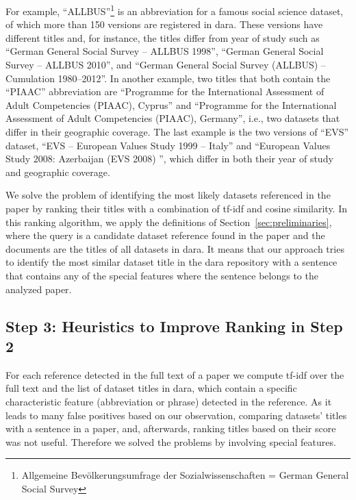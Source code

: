 \documentclass{IOS-Book-Article}
\newcommand{\dara}{\textsf{da\textbar ra}}
\begin{document}
For example, \enquote{ALLBUS}\footnote{Allgemeine Bev\"olkerungsumfrage der Sozialwissenschaften = German General Social Survey} is an abbreviation for a famous social science dataset, of which more than 150 versions are registered in {\dara}. These versions have different titles and, for instance, the titles differ from year of study such as \enquote{German General
Social Survey -- ALLBUS 1998}, 
\enquote{German General Social Survey -- ALLBUS 2010}, and \enquote{German General Social Survey (ALLBUS) -- Cumulation 1980--2012}.
In another example, two titles that both contain the \enquote{PIAAC} abbreviation are \enquote{Programme for the International Assessment of Adult Competencies (PIAAC), Cyprus} and \enquote{Programme for the International Assessment of Adult Competencies (PIAAC), Germany}, i.e., two datasets that differ in their geographic coverage. The last example is the two versions of \enquote{EVS} dataset, 
\enquote{EVS -- European Values Study 1999 -- Italy} and \enquote{European Values Study 2008: Azerbaijan (EVS 2008) }, which differ in both their year of study and geographic coverage.

We solve the problem of identifying the most likely datasets referenced in the paper by ranking their titles with a combination of tf-idf and cosine similarity. In this ranking algorithm, we apply the definitions of Section~\ref{sec:preliminaries}, where the query is a candidate dataset reference found in the paper and the documents are the titles of all datasets in {\dara}. 
It means that our approach tries to identify the most similar dataset title in the {\dara} repository with a sentence that contains any of the special features where the sentence belongs to the analyzed paper.

\subsection{Step 3: Heuristics to Improve Ranking in Step 2}
\label{sec:heur-impr-rank}

For each reference detected in the full text of a paper we compute tf-idf over the full text and the list of dataset titles in {\dara}, which contain a specific characteristic feature (abbreviation or phrase) detected in the reference.
As it leads to many false positives based on our observation, comparing datasets' titles with a sentence in a paper, and, afterwards, ranking titles based on their score was not useful. Therefore we solved the problems by involving special features.
\end{document}
